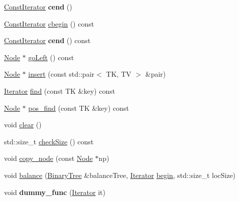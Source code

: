 \begin{DoxyCompactItemize}
\item 
\mbox{\label{classBinaryTree_a503645b7d06f1c24ba25042d3e1987b5}} 
\mbox{\hyperlink{classBinaryTree_1_1ConstIterator}{Const\+Iterator}} {\bfseries cend} ()
\item 
\mbox{\hyperlink{classBinaryTree_1_1ConstIterator}{Const\+Iterator}} \mbox{\hyperlink{classBinaryTree_a70ad506f00c666f7e3b26f78e66709c7}{cbegin}} () const
\item 
\mbox{\label{classBinaryTree_a9557ea5e5b15a398aaa390313a73be44}} 
\mbox{\hyperlink{classBinaryTree_1_1ConstIterator}{Const\+Iterator}} {\bfseries cend} () const
\item 
\mbox{\hyperlink{structBinaryTree_1_1Node}{Node}} $\ast$ \mbox{\hyperlink{classBinaryTree_a5b7168f283acc83b39e5af15b9817b47}{go\+Left}} () const
\item 
\mbox{\hyperlink{structBinaryTree_1_1Node}{Node}} $\ast$ \mbox{\hyperlink{classBinaryTree_a356114cfeed3598a9a37907eafed7b25}{insert}} (const std\+::pair$<$ TK, TV $>$ \&pair)
\item 
\mbox{\hyperlink{classBinaryTree_1_1Iterator}{Iterator}} \mbox{\hyperlink{classBinaryTree_ab7ca7386a799bd4ec8cece3a0e15d7e3}{find}} (const TK \&key) const
\item 
\mbox{\hyperlink{structBinaryTree_1_1Node}{Node}} $\ast$ \mbox{\hyperlink{classBinaryTree_a59ebcb199618fe76be5f3a9c813c95c9}{pos\+\_\+find}} (const TK \&key) const
\item 
void \mbox{\hyperlink{classBinaryTree_a264446922f6d5fe75d4a41c650f88d6a}{clear}} ()
\item 
std\+::size\+\_\+t \mbox{\hyperlink{classBinaryTree_a8e35d6be680d9fbd5129361337ada338}{check\+Size}} () const
\item 
void \mbox{\hyperlink{classBinaryTree_a01dfd4a677465fbc20923794e2363b44}{copy\+\_\+node}} (const \mbox{\hyperlink{structBinaryTree_1_1Node}{Node}} $\ast$np)
\item 
void \mbox{\hyperlink{classBinaryTree_a1c3972b0a02afa3c6c35dcad6b8440c5}{balance}} (\mbox{\hyperlink{classBinaryTree}{Binary\+Tree}} \&balance\+Tree, \mbox{\hyperlink{classBinaryTree_1_1Iterator}{Iterator}} \mbox{\hyperlink{classBinaryTree_a828acf65e70cf4b6e106807a052ca508}{begin}}, std\+::size\+\_\+t loc\+Size)
\item 
\mbox{\label{classBinaryTree_ae92d2f804f2aecbd2f769ebd8534e02e}} 
void {\bfseries dummy\+\_\+func} (\mbox{\hyperlink{classBinaryTree_1_1Iterator}{Iterator}} it)
\end{DoxyCompactItemize}
